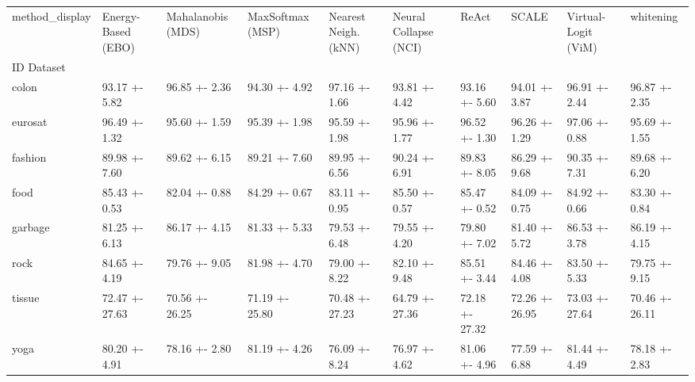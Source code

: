 \begin{tabular}{llllllllll}
\toprule
method_display & Energy-Based (EBO) & Mahalanobis (MDS) & MaxSoftmax (MSP) & Nearest Neigh. (kNN) & Neural Collapse (NCI) & ReAct & SCALE & Virtual-Logit (ViM) & whitening \\
ID Dataset &  &  &  &  &  &  &  &  &  \\
\midrule
colon & 93.17 +- 5.82 & 96.85 +- 2.36 & 94.30 +- 4.92 & 97.16 +- 1.66 & 93.81 +- 4.42 & 93.16 +- 5.60 & 94.01 +- 3.87 & 96.91 +- 2.44 & 96.87 +- 2.35 \\
eurosat & 96.49 +- 1.32 & 95.60 +- 1.59 & 95.39 +- 1.98 & 95.59 +- 1.98 & 95.96 +- 1.77 & 96.52 +- 1.30 & 96.26 +- 1.29 & 97.06 +- 0.88 & 95.69 +- 1.55 \\
fashion & 89.98 +- 7.60 & 89.62 +- 6.15 & 89.21 +- 7.60 & 89.95 +- 6.56 & 90.24 +- 6.91 & 89.83 +- 8.05 & 86.29 +- 9.68 & 90.35 +- 7.31 & 89.68 +- 6.20 \\
food & 85.43 +- 0.53 & 82.04 +- 0.88 & 84.29 +- 0.67 & 83.11 +- 0.95 & 85.50 +- 0.57 & 85.47 +- 0.52 & 84.09 +- 0.75 & 84.92 +- 0.66 & 83.30 +- 0.84 \\
garbage & 81.25 +- 6.13 & 86.17 +- 4.15 & 81.33 +- 5.33 & 79.53 +- 6.48 & 79.55 +- 4.20 & 79.80 +- 7.02 & 81.40 +- 5.72 & 86.53 +- 3.78 & 86.19 +- 4.15 \\
rock & 84.65 +- 4.19 & 79.76 +- 9.05 & 81.98 +- 4.70 & 79.00 +- 8.22 & 82.10 +- 9.48 & 85.51 +- 3.44 & 84.46 +- 4.08 & 83.50 +- 5.33 & 79.75 +- 9.15 \\
tissue & 72.47 +- 27.63 & 70.56 +- 26.25 & 71.19 +- 25.80 & 70.48 +- 27.23 & 64.79 +- 27.36 & 72.18 +- 27.32 & 72.26 +- 26.95 & 73.03 +- 27.64 & 70.46 +- 26.11 \\
yoga & 80.20 +- 4.91 & 78.16 +- 2.80 & 81.19 +- 4.26 & 76.09 +- 8.24 & 76.97 +- 4.62 & 81.06 +- 4.96 & 77.59 +- 6.88 & 81.44 +- 4.49 & 78.18 +- 2.83 \\
\bottomrule
\end{tabular}
